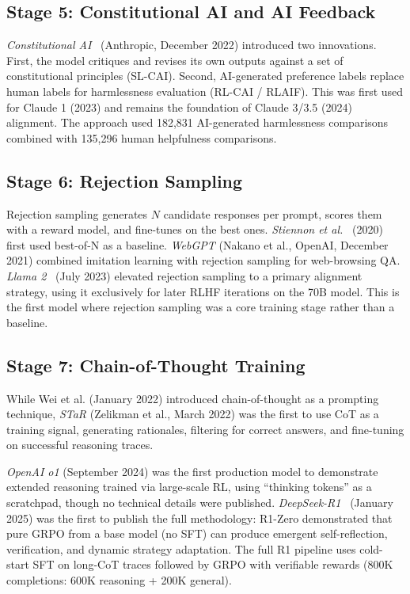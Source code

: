 \documentclass[12pt]{article}
\begin{document}
\subsection{Stage 5: Constitutional AI and AI Feedback}

\textit{Constitutional AI}~\cite{Bai2022Constitutional} (Anthropic, December 2022) introduced two innovations. First, the model critiques and revises its own outputs against a set of constitutional principles (SL-CAI). Second, AI-generated preference labels replace human labels for harmlessness evaluation (RL-CAI / RLAIF). This was first used for Claude 1 (2023) and remains the foundation of Claude 3/3.5 (2024) alignment. The approach used 182,831 AI-generated harmlessness comparisons combined with 135,296 human helpfulness comparisons.

\subsection{Stage 6: Rejection Sampling}

Rejection sampling generates $N$ candidate responses per prompt, scores them with a reward model, and fine-tunes on the best ones. \textit{Stiennon et al.}~\cite{Stiennon2020Summarize} (2020) first used best-of-N as a baseline. \textit{WebGPT} (Nakano et al., OpenAI, December 2021) combined imitation learning with rejection sampling for web-browsing QA. \textit{Llama 2}~\cite{Touvron2023Llama2} (July 2023) elevated rejection sampling to a primary alignment strategy, using it exclusively for later RLHF iterations on the 70B model. This is the first model where rejection sampling was a core training stage rather than a baseline.

\subsection{Stage 7: Chain-of-Thought Training}

While Wei et al. (January 2022) introduced chain-of-thought as a prompting technique, \textit{STaR} (Zelikman et al., March 2022) was the first to use CoT as a training signal, generating rationales, filtering for correct answers, and fine-tuning on successful reasoning traces.

\textit{OpenAI o1} (September 2024) was the first production model to demonstrate extended reasoning trained via large-scale RL, using ``thinking tokens'' as a scratchpad, though no technical details were published. \textit{DeepSeek-R1}~\cite{Guo2025DeepSeekR1} (January 2025) was the first to publish the full methodology: R1-Zero demonstrated that pure GRPO from a base model (no SFT) can produce emergent self-reflection, verification, and dynamic strategy adaptation. The full R1 pipeline uses cold-start SFT on long-CoT traces followed by GRPO with verifiable rewards (800K completions: 600K reasoning + 200K general).
\end{document}
